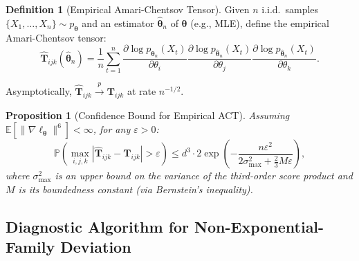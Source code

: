 \documentclass[12pt,a4paper]{article}
\theoremstyle{plain}
\newtheorem{proposition}[theorem]{Proposition}
\theoremstyle{definition}
\newtheorem{definition}[theorem]{Definition}
\theoremstyle{remark}
\newcommand{\E}{\mathbb{E}}
\newcommand{\Prob}{\mathbb{P}}
\newcommand{\ACT}{\mathbf{T}}    %
\begin{document}
\begin{definition}[Empirical Amari-Chentsov Tensor]
\label{def:empirical_ACT}
Given $n$ i.i.d.\ samples $\{X_1, \ldots, X_n\} \sim p_{\bm{\theta}}$ and an estimator $\hat{\bm{\theta}}_n$ of $\bm{\theta}$ (e.g., MLE), define the empirical Amari-Chentsov tensor:
\begin{equation}\label{eq:emp_ACT}
    \widehat{\ACT}_{ijk}(\hat{\bm{\theta}}_n) =
    \frac{1}{n} \sum_{t=1}^n
    \frac{\partial \log p_{\hat{\bm{\theta}}_n}(X_t)}{\partial \theta_i}
    \frac{\partial \log p_{\hat{\bm{\theta}}_n}(X_t)}{\partial \theta_j}
    \frac{\partial \log p_{\hat{\bm{\theta}}_n}(X_t)}{\partial \theta_k}.
\end{equation}

Asymptotically, $\widehat{\ACT}_{ijk} \xrightarrow{p} \ACT_{ijk}$ at rate $n^{-1/2}$.
\end{definition}

\begin{proposition}[Confidence Bound for Empirical ACT]
\label{prop:ACT_confidence}
Assuming $\E[\|\nabla \ell_{\bm{\theta}}\|^6] < \infty$, for any $\varepsilon > 0$:
\begin{equation}\label{eq:ACT_confidence}
    \Prob\left(\max_{i,j,k} |\widehat{\ACT}_{ijk} - \ACT_{ijk}| > \varepsilon\right)
    \leq d^3 \cdot 2\exp\left(-\frac{n\varepsilon^2}{2\sigma^2_{\max} + \frac{2}{3}M\varepsilon}\right),
\end{equation}
where $\sigma^2_{\max}$ is an upper bound on the variance of the third-order score product and $M$ is its boundedness constant (via Bernstein's inequality).
\end{proposition}

\subsection{Diagnostic Algorithm for Non-Exponential-Family Deviation}
\end{document}
